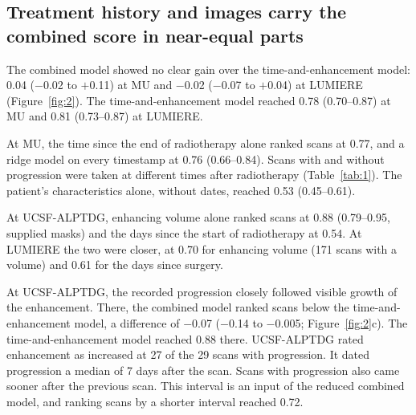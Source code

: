 \documentclass[largeformat]{interact} %
\begin{document}
\subsection{Treatment history and images carry the combined score in near-equal parts}\label{sec:3.2}

The combined model showed no clear gain over the time-and-enhancement model: 0.04 ($-$0.02 to $+$0.11) at MU and
$-$0.02 ($-$0.07 to $+$0.04) at LUMIERE (Figure~\ref{fig:2}). The time-and-enhancement model reached 0.78 (0.70--0.87)
at MU and 0.81 (0.73--0.87) at LUMIERE.

At MU, the time since the end of radiotherapy alone ranked scans at 0.77, and a ridge model on every timestamp at
0.76 (0.66--0.84). Scans with and without progression were taken at
different times after radiotherapy (Table~\ref{tab:1}). The patient's characteristics alone, without dates, reached
0.53 (0.45--0.61).

At UCSF-ALPTDG, enhancing volume alone ranked scans at 0.88 (0.79--0.95, supplied masks) and the days since the start of
radiotherapy at 0.54. At LUMIERE the two were closer, at 0.70 for enhancing volume (171 scans with a volume) and 0.61 for the days since surgery.

At UCSF-ALPTDG, the recorded progression closely followed visible growth of the enhancement. There, the combined
model ranked scans below the time-and-enhancement model, a difference of $-$0.07 ($-$0.14
to $-$0.005; Figure~\ref{fig:2}c). The time-and-enhancement model reached 0.88 there. UCSF-ALPTDG rated enhancement as
increased at 27 of the 29 scans with progression. It dated progression a median of 7 days after the scan. Scans with
progression also came sooner after the previous scan. This interval is an input of the reduced combined model, and
ranking scans by a shorter interval reached 0.72.
\end{document}
